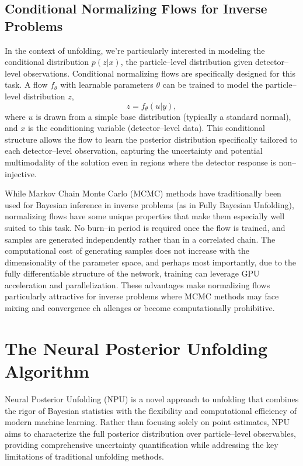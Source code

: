 \subsection{Conditional Normalizing Flows for Inverse Problems}
    In the context of unfolding, we're particularly interested in modeling the conditional distribution $p(z|x)$, the particle--level distribution given detector--level observations.
    Conditional normalizing flows are specifically designed for this task.
    A flow \(f_\theta\) with learnable parameters \(\theta\) can be trained to model the particle--level distribution \(z\),
    \[
        z = f_\theta(u|y),
    \]
    where $u$ is drawn from a simple base distribution (typically a standard normal), and $x$ is the conditioning variable (detector--level data).
    This conditional structure allows the flow to learn the posterior distribution specifically tailored to each detector--level observation, capturing the uncertainty and potential multimodality of the solution even in regions where the detector response is non--injective.

    While Markov Chain Monte Carlo (MCMC) methods have traditionally been used for Bayesian inference in inverse problems (as in Fully Bayesian Unfolding), normalizing flows have some unique properties that make them especially well suited to this task.
    No burn--in period is required once the flow is trained,
    and samples are generated independently rather than in a correlated chain.
    The computational cost of generating samples does not increase with the dimensionality of the parameter space, and perhaps most importantly,
    due to the fully differentiable structure of the network, training can leverage GPU acceleration and parallelization.
    These advantages make normalizing flows particularly attractive for inverse problems where MCMC methods may face mixing and convergence ch  allenges or become computationally prohibitive.
\section{The Neural Posterior Unfolding Algorithm}
Neural Posterior Unfolding (NPU) is a novel approach to unfolding that combines the rigor of Bayesian statistics with the flexibility and computational efficiency of modern machine learning.
%
Rather than focusing solely on point estimates, NPU aims to characterize the full posterior distribution over particle--level observables, providing comprehensive uncertainty quantification while addressing the key limitations of traditional unfolding methods.
